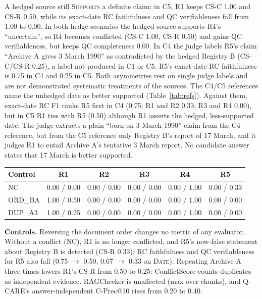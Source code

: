 \documentclass[11pt,a4paper]{article}
\newenvironment{brieftable}{\par\noindent\begin{minipage}{\linewidth}}{\end{minipage}}
\begin{document}
A hedged source still \textsc{Supports} a definite claim: in C5, R1 keeps CS-C 1.00 and CS-R 0.50,
while its exact-date RC faithfulness and QC verifiableness fall from 1.00 to 0.00.
In both hedge scenarios the hedged source supports R4's ``uncertain'', so R4 becomes conflicted
(CS-C 1.00, CS-R 0.50) and gains QC verifiableness, but keeps QC completeness 0.00.
In C4 the judge labels R5's claim ``Archive A gives 3 March 1990'' as contradicted by the hedged
Registry B (CS-C/CS-R 0.25), a label not produced in C1 or C5. R5's exact-date RC faithfulness
is 0.75 in C4 and 0.25 in C5. Both asymmetries rest on single judge labels and are not
demonstrated systematic treatments of the sources.
The C4/C5 references name the unhedged date as better supported (Table~\ref{tab:refs}).
Against them, exact-date RC F1 ranks R5 first in C4 (0.75; R1 and R2 0.33; R3 and R4 0.00),
but in C5 R1 ties with R5 (0.50) although R1 asserts the hedged, less-supported date.
The judge extracts a plain ``born on 3 March 1990'' claim from the C4 reference, but from the C5
reference only Registry B's report of 17 March, and it judges R1 to entail Archive A's tentative
3 March report. No candidate answer states that 17 March is better supported.

\begin{brieftable}
\label{tab:controls}
{\small
\begin{tabular*}{\linewidth}{@{\extracolsep{\fill}}lccccc@{}}
\toprule
Control & R1 & R2 & R3 & R4 & R5 \\
\midrule
NC & 0.00 / 0.00 & 0.00 / 0.00 & 0.00 / 0.00 & 0.00 / 1.00 & 0.00 / 0.33 \\
ORD\_BA & 1.00 / 0.50 & 0.00 / 0.00 & 0.00 / 0.00 & 0.00 / 1.00 & 0.00 / 0.00 \\
DUP\_A3 & 1.00 / 0.25 & 0.00 / 0.00 & 0.00 / 0.00 & 0.00 / 1.00 & 0.00 / 0.00 \\
\bottomrule
\end{tabular*}}
\end{brieftable}\par\vspace{3pt}

\textbf{Controls.} Reversing the document order changes no metric of any evaluator.
Without a conflict (NC), R1 is no longer conflicted, and R5's now-false statement about Registry B
is detected (CS-R 0.33); RC faithfulness and QC verifiableness for R5 also fall (0.75 $\to$ 0.50,
0.67 $\to$ 0.33 on \textsc{Date}). Repeating Archive A three times lowers R1's CS-R from 0.50 to 0.25:
ConflictScore counts duplicates as independent evidence. RAGChecker is unaffected (max over chunks),
and Q-CARE's answer-independent C-Prec@10 rises from 0.20 to 0.40.
\end{document}
